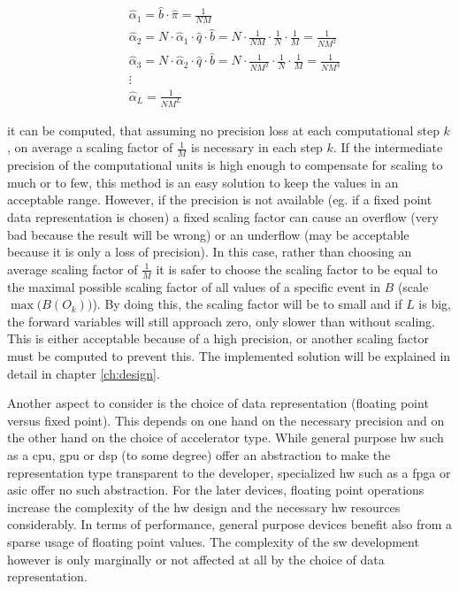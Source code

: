 \documentclass[mscthesis]{usiinfthesis}
\begin{document}
\begin{equation}\begin{split}
    \label{eq:scaling_estimation}
    &\hat{\alpha}_1 = \hat{b} \cdot \hat{\pi} = \frac{1}{NM} \\
    &\hat{\alpha}_2 = N \cdot \hat{\alpha}_1 \cdot \hat{q} \cdot \hat{b} =
        N \cdot \frac{1}{NM} \cdot \frac{1}{N} \cdot \frac{1}{M} =
        \frac{1}{NM^2} \\
    &\hat{\alpha}_3 = N \cdot \hat{\alpha}_2 \cdot \hat{q} \cdot \hat{b} =
        N \cdot \frac{1}{NM^2} \cdot \frac{1}{N} \cdot \frac{1}{M} =
        \frac{1}{NM^3} \\
    &\vdots\\
    & \hat{\alpha}_L = \frac{1}{NM^L}
\end{split}\end{equation}

it can be computed, that assuming no precision loss at each computational step
$k$, on average a scaling factor of $\frac{1}{M}$ is necessary in each step
$k$. If the intermediate precision of the computational units is high enough to
compensate for scaling to much or to few, this method is an easy solution to
keep the values in an acceptable range. However, if the precision is not
available (eg. if a fixed point data representation is chosen) a fixed scaling
factor can cause an overflow (very bad because the result will be wrong) or an
underflow (may be acceptable because it is only a loss of precision). In this
case, rather than choosing an average scaling factor of $\frac{1}{M}$ it is
safer to choose the scaling factor to be equal to the maximal possible scaling
factor of all values of a specific event in $B$ (scale $\max\big(B(O_k)\big)$).
By doing this, the scaling factor will be to small and if $L$ is big, the
forward variables will still approach zero, only slower than without scaling.
This is either acceptable because of a high precision, or another scaling
factor must be computed to prevent this. The implemented solution will be
explained in detail in chapter \ref{ch:design}.

Another aspect to consider is the choice of data representation (floating point
versus fixed point). This depends on one hand on the necessary precision and on
the other hand on the choice of accelerator type. While general purpose
\gls{hw} such as a \gls{cpu}, \gls{gpu} or \gls{dsp} (to some degree) offer an
abstraction to make the representation type transparent to the developer,
specialized \gls{hw} such as a \gls{fpga} or \gls{asic} offer no such
abstraction. For the later devices, floating point operations increase the
complexity of the \gls{hw} design and the necessary \gls{hw} resources
considerably. In terms of performance, general purpose devices benefit also
from a sparse usage of floating point values. The complexity of the \gls{sw}
development however is only marginally or not affected at all by the choice of
data representation.
\end{document}
